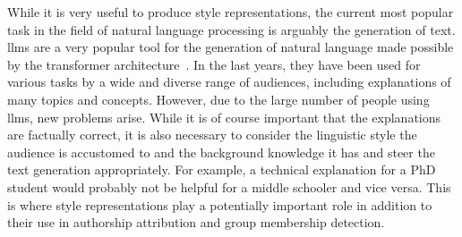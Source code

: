 While it is very useful to produce style representations, the current most popular task in the field of natural language processing is arguably the generation of text. \Acp{llm} are a very popular tool for the generation of natural language made possible by the transformer architecture~\cite{NIPS2017_3f5ee243}. In the last years, they have been used for various tasks by a wide and diverse range of audiences, including explanations of many topics and concepts. However, due to the large number of people using \acp{llm}, new problems arise. While it is of course important that the explanations are factually correct, it is also necessary to consider the linguistic style the audience is accustomed to and the background knowledge it has and steer the text generation appropriately. For example, a technical explanation for a PhD student would probably not be helpful for a middle schooler and vice versa. This is where style representations play a potentially important role in addition to their use in authorship attribution and group membership detection.




